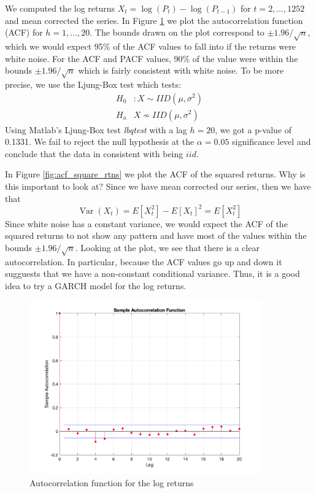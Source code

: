 \documentclass{article}
\DeclareMathOperator{\Var}{Var}
\begin{document}
We computed the log returns $X_t = \log(P_t) - \log(P_{t - 1})$ for $t = 2,\ldots, 1252$ and mean corrected the series.
In Figure \ref{fig:acf_log_rtns} we plot the autocorrelation function (ACF) for $h = 1,\ldots, 20$.
The bounds drawn on the plot correspond to $\pm 1.96/\sqrt{n}$, which we would expect 95\% of the ACF values to fall into if the returns were white noise.
For the ACF and PACF values, 90\% of the value were within the bounds $\pm 1.96/\sqrt{n}$ which is fairly consistent with white noise.
To be more precise, we use the Ljung-Box test which tests:
\begin{align*}
H_0&: X \sim IID(\mu, \sigma^2)\\
H_a& X \not \sim IID(\mu, \sigma^2)
\end{align*}
Using Matlab's Ljung-Box test \textit{lbqtest} with a lag $h = 20$, we got a p-value of 0.1331.
We fail to reject the null hypothesis at the $\alpha = 0.05$ significance level and conclude that the data in consistent with being $iid$.

In Figure \ref{fig:acf_square_rtns} we plot the ACF of the squared returns.
Why is this important to look at?
Since we have mean corrected our series, then we have that
$$
\Var(X_t) = E[X_t^2] - E[X_t]^2 = E[X_t^2]
$$
Since white noise has a constant variance, we would expect the ACF of the squared returns to not show any pattern and have most of the values within the bounds $\pm 1.96/\sqrt{n}$.
Looking at the plot, we see that there is a clear autocorrelation.
In particular, because the ACF values go up and down it sugguests that we have a non-constant conditional variance.
Thus, it is a good idea to try a GARCH model for the log returns.

\begin{figure}[H]
\includegraphics[width=10cm]{plots/acf_log_rtns.png}
\centering
\caption{Autocorrelation function for the log returns}
\label{fig:acf_log_rtns}
\end{figure}
\end{document}
